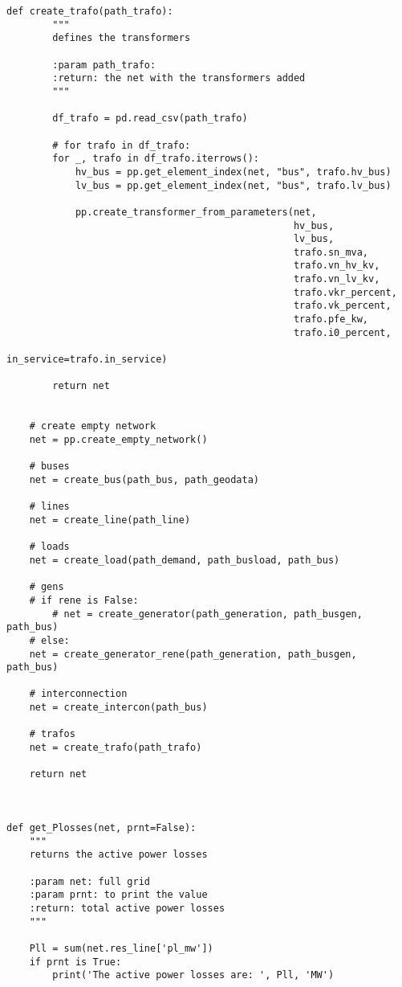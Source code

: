\begin{lstlisting}[caption={Main code in Python with the Pandapower library}]
    def create_trafo(path_trafo):
        """
        defines the transformers

        :param path_trafo:
        :return: the net with the transformers added
        """

        df_trafo = pd.read_csv(path_trafo)

        # for trafo in df_trafo:
        for _, trafo in df_trafo.iterrows():
            hv_bus = pp.get_element_index(net, "bus", trafo.hv_bus)
            lv_bus = pp.get_element_index(net, "bus", trafo.lv_bus)

            pp.create_transformer_from_parameters(net,
                                                  hv_bus,
                                                  lv_bus,
                                                  trafo.sn_mva,
                                                  trafo.vn_hv_kv,
                                                  trafo.vn_lv_kv,
                                                  trafo.vkr_percent,
                                                  trafo.vk_percent,
                                                  trafo.pfe_kw,
                                                  trafo.i0_percent,
                                                  in_service=trafo.in_service)

        return net


    # create empty network
    net = pp.create_empty_network()

    # buses
    net = create_bus(path_bus, path_geodata)

    # lines
    net = create_line(path_line)

    # loads
    net = create_load(path_demand, path_busload, path_bus)

    # gens
    # if rene is False:
        # net = create_generator(path_generation, path_busgen, path_bus)
    # else:
    net = create_generator_rene(path_generation, path_busgen, path_bus)

    # interconnection
    net = create_intercon(path_bus)

    # trafos
    net = create_trafo(path_trafo)

    return net



def get_Plosses(net, prnt=False):
    """
    returns the active power losses

    :param net: full grid
    :param prnt: to print the value
    :return: total active power losses
    """

    Pll = sum(net.res_line['pl_mw'])
    if prnt is True:
        print('The active power losses are: ', Pll, 'MW')


\end{lstlisting}
